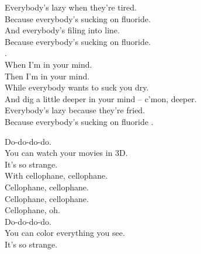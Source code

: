 
\label{album:im-in-your-mind-fuzz}




Everybody's lazy when they're tired. \\
Because everybody's sucking on fluoride. \\
And everybody's filing into line. \\
Because everybody's sucking on fluoride. \\. \\

When I'm in your mind. \\
Then I'm in your mind. \\

While everybody wants to suck you dry. \\
And dig a little deeper in your mind -- c'mon, deeper. \\
Everybody's lazy because they're fried. \\
Because everybody's sucking on fluoride . \\








Do-do-do-do. \\

You can watch your movies in 3D. \\
It's so strange. \\

With cellophane, cellophane. \\
Cellophane, cellophane. \\
Cellophane, cellophane. \\
Cellophane, oh. \\
Do-do-do-do. \\

You can color everything you see. \\
It's so strange. \\

